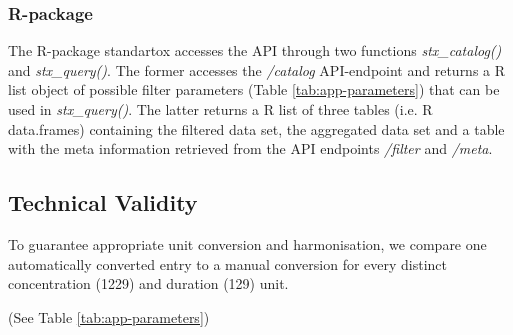 \subsubsection*{R-package}
The R-package standartox accesses the API through two functions \textit{stx\_catalog()} and \textit{stx\_query()}. The former accesses the \textit{/catalog} API-endpoint and returns a R list object of possible filter parameters (Table \ref{tab:app-parameters}) that can be used in \textit{stx\_query()}. The latter returns a R list of three tables (i.e. R data.frames) containing the filtered data set, the aggregated data set and a table with the meta information retrieved from the API endpoints \textit{/filter} and \textit{/meta}.

\subsection*{Technical Validity}
To guarantee appropriate unit conversion and harmonisation, we compare one automatically converted entry to a manual conversion for every distinct concentration (1229) and duration (129) unit.


(See Table \ref{tab:app-parameters})




\iffalse
- Endpoint: For the last parameter here, only be exclusive. 

TODO: How does this fit?
\begin{table}
    
    \caption{Reduction of data in the compilation process for Standartox}
    \label{tab:data-refinement}
\end{table}

\fi


\iffalse
\textbf{OLD: Standartox aggregates the test results according to chosen filters in a two step process. Firstly the filtered test results are aggregated by the CAS number, the chosen taxon and the selected test duration. Secondly, the returned data is then aggregated by the CAS number. The former can't be influenced by the user and calculates either the minimum or the median depending on the amount of results to aggregate (n <= 2: minimum, if n > 2: median). Thereof the second step calculates the minimum, the maximum, the median, the geometric mean, or the arithmetic mean as an aggregate.}
\fi



